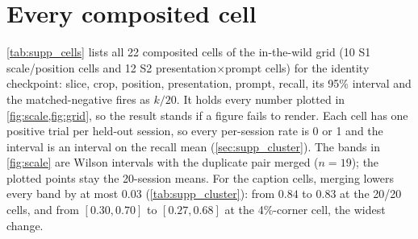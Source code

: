\clearpage
\setcounter{page}{1}
\maketitlesupplementary

\section{Every composited cell}
\label{sec:supp_cells}

\cref{tab:supp_cells} lists all 22 composited cells of the in-the-wild grid
(10 S1 scale/position cells and 12 S2 presentation$\times$prompt cells) for the
identity checkpoint: slice, crop, position, presentation, prompt, recall, its
95\% interval and the matched-negative fires as $k/20$. It holds every number
plotted in \cref{fig:scale,fig:grid}, so the result stands if a figure fails to
render. Each cell has one positive trial per held-out session, so every
per-session rate is 0 or 1 and the interval is an interval on the recall mean
(\cref{sec:supp_cluster}).
The bands in \cref{fig:scale} are Wilson intervals with the duplicate pair merged ($n{=}19$);
the plotted points stay the 20-session means. For the caption cells, merging lowers every band by
at most $0.03$ (\cref{tab:supp_cluster}): from $0.84$ to $0.83$ at the 20/20 cells, and from
$[0.30, 0.70]$ to $[0.27, 0.68]$ at the 4\%-corner cell, the widest change.



